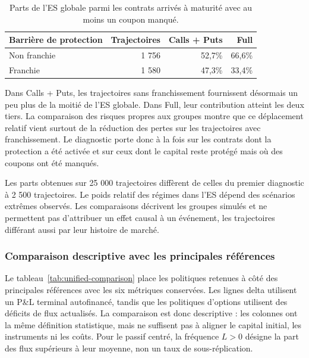 \documentclass[12pt,a4paper]{article}
\newcommand{\1}{\mathbf{1}}
\begin{document}
\begin{table}[H]
\centering
\small
\begin{tabular}{lrrr}
\toprule
Barrière de protection & Trajectoires & Calls + Puts & Full \\
\midrule
Non franchie & 1 756 & 52,7\% & 66,6\% \\
Franchie & 1 580 & 47,3\% & 33,4\% \\
\bottomrule
\end{tabular}
\caption{Parts de l’ES globale parmi les contrats arrivés à maturité avec au moins un coupon manqué.}
\label{tab:tail-global-shares}
\end{table}

Dans Calls + Puts, les trajectoires sans franchissement fournissent désormais un peu plus de la moitié de l’ES globale. Dans Full, leur contribution atteint les deux tiers. La comparaison des risques propres aux groupes montre que ce déplacement relatif vient surtout de la réduction des pertes sur les trajectoires avec franchissement. Le diagnostic porte donc à la fois sur les contrats dont la protection a été activée et sur ceux dont le capital reste protégé mais où des coupons ont été manqués.

Les parts obtenues sur 25 000 trajectoires diffèrent de celles du premier diagnostic à 2 500 trajectoires. Le poids relatif des régimes dans l’ES dépend des scénarios extrêmes observés. Les comparaisons décrivent les groupes simulés et ne permettent pas d’attribuer un effet causal à un événement, les trajectoires différant aussi par leur histoire de marché.

\subsubsection*{Comparaison descriptive avec les principales références}

Le tableau~\ref{tab:unified-comparison} place les politiques retenues à côté des
principales références avec les six métriques conservées. Les lignes delta utilisent
un P\&L terminal autofinancé, tandis que les politiques d'options utilisent des
déficits de flux actualisés. La comparaison est donc descriptive : les colonnes ont
la même définition statistique, mais ne suffisent pas à aligner le capital initial,
les instruments ni les coûts. Pour le passif centré, la fréquence $L>0$ désigne la
part des flux supérieurs à leur moyenne, non un taux de sous-réplication.
\end{document}
